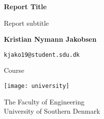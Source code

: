 \begin{titlepage}
    \begin{center}
        \vspace*{1cm}
        \textbf{Report Title}
        \vspace{0.5cm}

        Report subtitle
        \vspace{1.5cm}

        \textbf{Kristian Nymann Jakobsen} 
        \vspace{0.5cm}

        \texttt{kjako19@student.sdu.dk}
        \vfill

        Course
        \vspace{0.8cm}

        \texttt{[image: university]}
        \vspace{0.5cm}

        The Faculty of Engineering \\
        University of Southern Denmark\\
        \date{\today}
    \end{center}
\end{titlepage}
